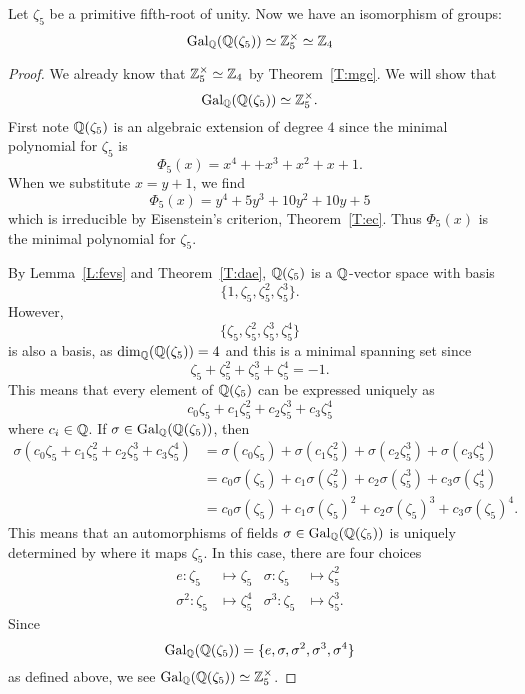 \documentclass{ximera}
\begin{document}
\begin{example}[$\boldsymbol{\gal_{\pmb\Q}\pmb(\pmb\Q\pmb(\zeta_5\pmb)\pmb)}$]
  Let $\zeta_5$ be a primitive fifth-root of
  unity. Now we have an isomorphism of groups:
  \[
  \operatorname{Gal}_{\mathbb Q}(\mathbb Q(\zeta_5))\simeq\mathbb Z_5^\times\simeq \mathbb Z_4
  \]
  \begin{proof}
    We already know that $\mathbb Z_5^\times\simeq \mathbb Z_4$ by
    Theorem~\ref{T:mgc}. We will show that
    \[
    \operatorname{Gal}_{\mathbb Q}(\mathbb Q(\zeta_5))\simeq\mathbb Z_5^\times.
    \]
    First note $\mathbb Q(\zeta_5)$ is an algebraic extension of degree $4$
    since the minimal polynomial for $\zeta_5$ is
    \[
    \Phi_5(x) = x^4+ +x^3+x^2 + x + 1.
    \]
    When we substitute $x = y+ 1$, we find
    \[
    \Phi_5(x) = y^{4} +5y^3+10y^2+10y+5
    \]
    which is irreducible by Eisenstein's criterion,
    Theorem~\ref{T:ec}. Thus $\Phi_5(x)$ is the minimal polynomial for
    $\zeta_5$.


    By Lemma~\ref{L:fevs} and Theorem~\ref{T:dae},
    $\mathbb Q(\zeta_5)$ is a $\mathbb Q$-vector space with basis
    \[
    \{1,\zeta_5,\zeta_5^2,\zeta_5^3\}.
    \]
    However,
    \[
    \{\zeta_5,\zeta_5^2,\zeta_5^3,\zeta_5^4\}
    \]
    is also a basis, as $\dim_\mathbb Q(\mathbb Q(\zeta_5))=4$ and this is a minimal
    spanning set since
    \[
    \zeta_5 + \zeta_5^2  + \zeta_5^3 + \zeta_5^4 = -1.
    \]
    This means that every element of $\mathbb Q(\zeta_5)$ can be expressed
    uniquely as
    \[
    c_0\zeta_5 + c_1\zeta_5^2  + c_2\zeta_5^3 + c_3\zeta_5^4 
    \]
    where $c_i\in\mathbb Q$. If $\sigma\in\operatorname{Gal}_\mathbb Q(\mathbb Q(\zeta_5))$, then
    \begin{align*}
      \sigma(c_0\zeta_5 + c_1\zeta_5^2  + c_2\zeta_5^3 + c_3\zeta_5^4) &= \sigma(c_0\zeta_5) + \sigma(c_1 \zeta_5^2)+ \sigma(c_2 \zeta_5^3)+ \sigma(c_3 \zeta_5^4)\\
      &= c_0 \sigma(\zeta_5) + c_1 \sigma(\zeta_5^2) + c_2 \sigma(\zeta_5^3) + c_3 \sigma(\zeta_5^4)\\
      &= c_0 \sigma(\zeta_5) + c_1 \sigma(\zeta_5)^2 + c_2 \sigma(\zeta_5)^3 + c_3 \sigma(\zeta_5)^4.
    \end{align*}
    This means that an automorphisms of fields $\sigma \in
    \operatorname{Gal}_\mathbb Q(\mathbb Q(\zeta_5))$ is uniquely determined by where it maps
    $\zeta_5$. In this case, there are four choices
    \begin{align*}
      e :\zeta_5 &\mapsto \zeta_5 &  \sigma :\zeta_5 &\mapsto \zeta_5^2\\
      \sigma^2 :\zeta_5 &\mapsto \zeta_5^4 &  \sigma^3 :\zeta_5 &\mapsto \zeta_5^3.
    \end{align*}
    Since
    \[
    \operatorname{Gal}_\mathbb Q(\mathbb Q(\zeta_5)) = \{e,\sigma,\sigma^2,\sigma^3,\sigma^4\}
    \]
    as defined above, we see $\operatorname{Gal}_\mathbb Q(\mathbb Q(\zeta_5))\simeq\mathbb Z_5^\times$.
  \end{proof}
\end{example}
\end{document}
